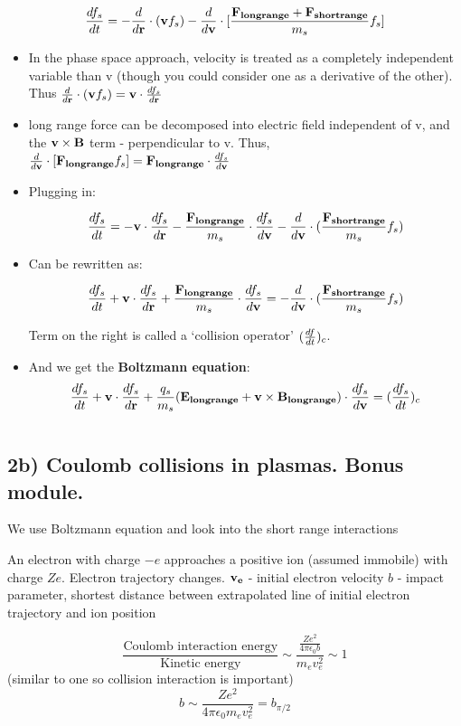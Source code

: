 \[ \frac{d f_s}{d t} = -\frac{d }{d \mathbf{r}} \cdot (\mathbf{v} f_s) - \frac{d }{d \mathbf{v}} \cdot [\frac{\mathbf{F_{long range}} + \mathbf{F_{short range}}}{m_s} f_s] \]

\begin{itemize}
	\item In the phase space approach, velocity is treated as a completely independent variable than v (though you could consider one as a derivative of the other). Thus $\frac{d }{d \mathbf{r}} \cdot (\mathbf{v} f_s) = \mathbf{v} \cdot	\frac{d f_s}{d \mathbf{r}}$
		\item long range force can be decomposed into electric field independent of v, and the  $\mathbf{v} \times \mathbf{B}$ term - perpendicular to v. Thus, $\frac{d }{d \mathbf{v}} \cdot [\mathbf{F_{long range}} f_s] = \mathbf{F_{long range}}\cdot\frac{d f_s}{d \mathbf{v}} $
	\item Plugging in:
	
	\[ \frac{d f_s}{d t} = -\mathbf{v}\cdot\frac{d f_s}{d \mathbf{r}} - \frac{\mathbf{F_{long range}}}{m_s} \cdot \frac{d f_s}{d \mathbf{v}} - \frac{d }{d \mathbf{v}} \cdot (\frac{\mathbf{F_{short range}}}{m_s} f_s) \]
	\item Can be rewritten as:
	
	\[ \frac{d f_s}{d t} +\mathbf{v}\cdot\frac{d f_s}{d \mathbf{r}} + \frac{\mathbf{F_{long range}}}{m_s} \cdot \frac{d f_s}{d \mathbf{v}} = - \frac{d }{d \mathbf{v}} \cdot (\frac{\mathbf{F_{short range}}}{m_s} f_s) \]
	
	Term on the right is called a `collision operator' $(\frac{d f}{d t})_c$.	
	
\item And we get the \textbf{Boltzmann equation}:
	\[ \frac{d f_s}{d t} +\mathbf{v}\cdot\frac{d f_s}{d \mathbf{r}} + \frac{q_s}{m_s}(\mathbf{E_{long range}} + \mathbf{v} \times \mathbf{B_{long range}}) \cdot \frac{d f_s}{d \mathbf{v}} = (\frac{d f_s}{d t})_c \]
\end {itemize}

\[   \]

\subsection{2b) Coulomb collisions in plasmas. Bonus module.}
We use Boltzmann equation and look into the short range interactions

An electron with charge $-e$ approaches a positive ion (assumed immobile) with charge $Ze$. Electron trajectory changes.
$\mathbf{v_e}$ - initial electron velocity
$b$ - impact parameter, shortest distance between extrapolated line of initial electron trajectory and ion position

\[\frac{\text{Coulomb interaction energy}}{\text{Kinetic energy}} \sim \frac{\frac{Ze^2}{4 \pi \epsilon_0 b}}{m_e v_e^2} \sim 1 \]
(similar to one so collision interaction is important)
\[b \sim \frac{Ze^2}{4 \pi \epsilon_0 m_e v_e^2} = b_{\pi/2} \]

